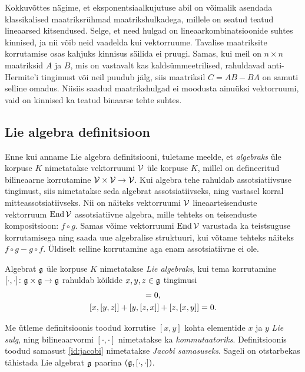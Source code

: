 Kokkuvõttes nägime, et eksponentsiaalkujutuse abil on võimalik asendada
klassikalised maatriksrühmad maatrikshulkadega, millele on seatud
teatud lineaarsed kitsendused. Selge, et need hulgad on lineaarkombinatsioonide
suhtes kinnised, ja nii võib neid vaadelda kui vektorruume.
Tavalise maatriksite korrutamise osas kahjuks kinnisus säilida ei
pruugi. Samas, kui meil on $n \times n$ maatriksid $A$ ja $B$, mis on vastavalt
kas kaldsümmeetrilised, rahuldavad anti-Hermite'i tingimust või neil
puudub jälg, siis maatriksil $C = AB - BA$ on samuti selline omadus.
Niisiis saadud maatrikshulgad ei moodusta ainuüksi vektorruumi,
vaid on kinnised ka teatud binaarse tehte suhtes.

\subsection{Lie algebra definitsioon}

Enne kui anname Lie algebra definitsiooni, tuletame meelde, et \emph{algebraks}
üle korpuse $K$ nimetatakse vektorruumi $\mathcal{V}$ üle korpuse $K$, millel on
defineeritud bilineaarne korrutamine $\mathcal{V} \times \mathcal{V} \to \mathcal{V}$. Kui algebra
tehe rahuldab assotsiatiivsuse tingimust, siis nimetatakse seda algebrat
assotsiatiivseks, ning vastasel korral mitteassotsiatiivseks. Nii on näiteks
vektorruumi $\mathcal{V}$ lineaarteisenduste vektorruum $\operatorname{End} \mathcal{V}$ assotsiatiivne
algebra, mille tehteks on teisenduste kompositsioon: $f \circ g$. Samas võime
vektorruumi $\operatorname{End} \mathcal{V}$ varustada ka teistsuguse korrutamisega ning saada uue
algebralise struktuuri, kui võtame tehteks näiteks $f \circ g - g \circ f$.
Üldiselt selline korrutamine aga enam assotsiatiivne ei ole.

\begin{dfn}\label{def:lie-algebra}
    Algebrat $\mathfrak{g}$ üle korpuse $K$ nimetatakse \emph{Lie algebraks}, kui
    tema korrutamine $[\cdot, \cdot] \colon \mathfrak{g} \times \mathfrak{g} \to \mathfrak{g}$ rahuldab
    kõikide $x, y, z \in \mathfrak{g}$ tingimusi
    \begin{gather}
        [x, x] = 0,\label{id:bracket-antisymm} \\
        \brac{x}{\brac{y}{z}} + \brac{y}{\brac{z}{x}} +
            \brac{z}{\brac{x}{y}} = 0.\label{id:jacobi}
    \end{gather}
\end{dfn}


Me ütleme definitsioonis toodud korrutise $[x, y]$ kohta elementide $x$ ja
$y$ \emph{Lie sulg}, ning bilineaarvormi $[\cdot, \cdot]$ nimetatakse ka
\emph{kommutaatoriks}. Definitsioonis toodud samasust \eqref{id:jacobi}
nimetatakse \emph{Jacobi samasuseks}. Sageli on otstarbekas tähistada Lie
algebrat $\mathfrak{g}$ paarina $(\mathfrak{g}, [\cdot, \cdot])$.

